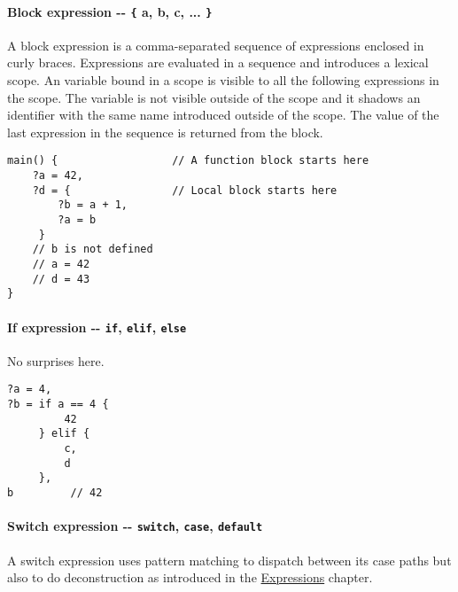\hypertarget{block-expression-----a-b-c--}{%
\paragraph{\texorpdfstring{Block expression -\/- \texttt{\{} a, b, c,
...
\texttt{\}}}{Block expression -\/- \{ a, b, c, ... \}}}\label{block-expression-----a-b-c--}}

A block expression is a comma-separated sequence of expressions enclosed
in curly braces. Expressions are evaluated in a sequence and introduces
a lexical scope. An variable bound in a scope is visible to all the
following expressions in the scope. The variable is not visible outside
of the scope and it shadows an identifier with the same name introduced
outside of the scope. The value of the last expression in the sequence
is returned from the block.

\begin{verbatim}
main() {                  // A function block starts here
    ?a = 42,
    ?d = {                // Local block starts here
        ?b = a + 1,
        ?a = b
     }
    // b is not defined
    // a = 42
    // d = 43
}
\end{verbatim}

\hypertarget{if-expression----if-elif-else}{%
\paragraph{\texorpdfstring{If expression -\/- \texttt{if},
\texttt{elif},
\texttt{else}}{If expression -\/- if, elif, else}}\label{if-expression----if-elif-else}}

No surprises here.

\begin{verbatim}
?a = 4,
?b = if a == 4 {
         42
     } elif {
         c,
         d
     },
b         // 42
\end{verbatim}

\hypertarget{switch-expression----switch-case-default}{%
\paragraph{\texorpdfstring{Switch expression -\/- \texttt{switch},
\texttt{case},
\texttt{default}}{Switch expression -\/- switch, case, default}}\label{switch-expression----switch-case-default}}

A switch expression uses pattern matching to dispatch between its case
paths but also to do deconstruction as introduced in the
\protect\hyperlink{expressions}{Expressions} chapter.

